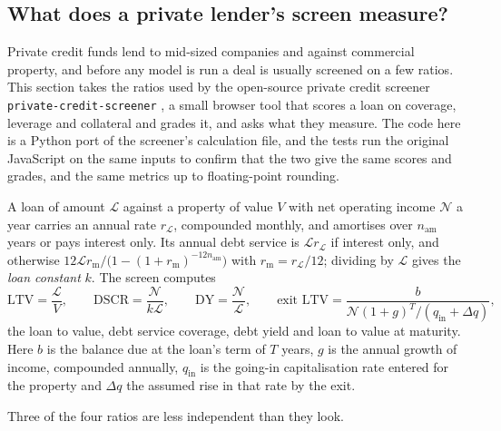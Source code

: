 \begin{chapterrefs}
\section{What does a private lender's screen measure?}
\label{sec6:private}

Private credit funds lend to mid-sized companies and against commercial property, and before any
model is run a deal is usually screened on a few ratios. This section takes the ratios used by the
open-source private credit screener \texttt{private-credit-screener} \parencite{pcscreener}, a small browser tool that scores a loan
on coverage, leverage and collateral and grades it, and asks what they measure. The code here is a
Python port of the screener's calculation file, and the tests run the original JavaScript on the same
inputs to confirm that the two give the same scores and grades, and the same metrics up to floating-point
rounding.

\begin{definition}\label{def6:screen}
A loan of amount $\mathcal L$ against a property of value $V$ with net operating income $\mathcal N$ a
year carries an annual rate $r_{\mathcal L}$, compounded monthly, and amortises over $n_{\mathrm{am}}$ years or pays
interest only. Its annual debt service is $\mathcal L r_{\mathcal L}$ if interest only, and otherwise
$12\mathcal L r_{\mathrm m}/\bigl(1-(1+r_{\mathrm m})^{-12n_{\mathrm{am}}}\bigr)$ with $r_{\mathrm m}=r_{\mathcal L}/12$; dividing by $\mathcal L$ gives the
\emph{loan constant} $k$. The screen computes
\[
  \mathrm{LTV}=\frac{\mathcal L}{V},\qquad \mathrm{DSCR}=\frac{\mathcal N}{k\mathcal L},\qquad
  \mathrm{DY}=\frac{\mathcal N}{\mathcal L},\qquad
  \text{exit LTV}=\frac{b}{\mathcal N(1+g)^T/(q_{\mathrm{in}}+\Delta q)},
\]
the loan to value, debt service coverage, debt yield and loan to value at maturity. Here $b$ is the
balance due at the loan's term of $T$ years, $g$ is the annual growth of income, compounded annually,
$q_{\mathrm{in}}$ is the going-in capitalisation rate entered for the property and $\Delta q$ the
assumed rise in that rate by the exit.
\end{definition}

Three of the four ratios are less independent than they look.


\end{chapterrefs}
